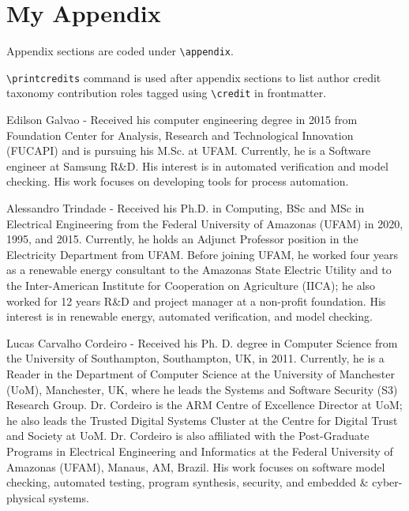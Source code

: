 \documentclass[a4paper,donotrepeattitle,fleqn]{cas-dc}
\begin{document}
\appendix
\section{My Appendix}
Appendix sections are coded under \verb+\appendix+.

\verb+\printcredits+ command is used after appendix sections to list 
author credit taxonomy contribution roles tagged using \verb+\credit+ 
in frontmatter.

\printcredits

%



%



Edilson Galvao - Received his computer engineering degree in 2015 from Foundation Center for Analysis, Research and Technological Innovation (FUCAPI) and is pursuing his M.Sc. at UFAM. Currently, he is a Software engineer at Samsung R\&D. His interest is in automated verification and model checking. His work focuses on developing tools for process automation.
\endbio

Alessandro Trindade - Received his Ph.D. in Computing, BSc and MSc in Electrical Engineering from the Federal University of Amazonas (UFAM) in 2020, 1995, and 2015. Currently, he holds an Adjunct Professor position in the Electricity Department from UFAM. Before joining UFAM, he worked four years as a renewable energy consultant to the Amazonas State Electric Utility and to the Inter-American Institute for Cooperation on Agriculture (IICA); he also worked for 12 years R\&D and project manager at a non-profit foundation. His interest is in renewable energy, automated verification, and model checking.
\endbio

Lucas Carvalho Cordeiro - Received his Ph. D. degree in Computer Science from the University of Southampton, Southampton, UK, in 2011. Currently, he is a Reader in the Department of Computer Science at the University of Manchester (UoM), Manchester, UK, where he leads the Systems and Software Security (S3) Research Group. Dr. Cordeiro is the ARM Centre of Excellence Director at UoM; he also leads the Trusted Digital Systems Cluster at the Centre for Digital Trust and Society at UoM. Dr. Cordeiro is also affiliated with the Post-Graduate Programs in Electrical Engineering and Informatics at the Federal University of Amazonas (UFAM), Manaus, AM, Brazil. His work focuses on software model checking, automated testing, program synthesis, security, and embedded \& cyber-physical systems.
\endbio
\end{document}
